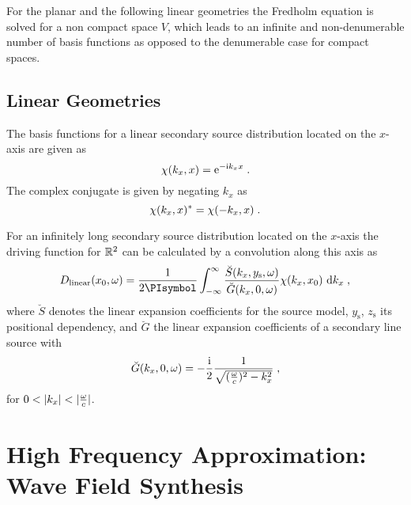 For the planar and the following linear geometries the Fredholm equation is
solved for a non compact space $V$, which leads to an infinite and
non-denumerable number of basis functions as
opposed to the denumerable case for compact spaces.\autocite{Schultz2014}


\subsection{Linear Geometries}
\label{sec:linear_geometries}

The basis functions for a linear secondary source distribution
located on the $x$-axis are given as
%
\begin{equation}
    \chi(k_x,x) = \E^{-\I k_x x} \qp
    \label{eq:linear_harmonics}
\end{equation}
%
The complex conjugate is given by negating $k_x$ as
%
\begin{equation}
    \chi(k_x,x)^* = \chi(-k_x,x) \;.
\end{equation}
%

For an infinitely long secondary source distribution located on the $x$-axis the
driving function for $\mathbb{R}^2$ can be calculated by a convolution along this axis
as\autocite[Compare (3.73) in][]{Ahrens2012}
%
\begin{equation}
    D_\text{linear}(x_0,\omega) = \frac{1}{2\PI} \int_{-\infty}^\infty
    \frac{\breve{S}(k_x,y_\text{s},\omega)}{\breve{G}(k_x,0,\omega)}
    \chi(k_x,x_0) \, \D{k_x} \qc
    \label{eq:D_linear}
\end{equation}
%
where $\breve{S}$ denotes the linear expansion coefficients for the
source model, $y_\text{s}$, $z_\text{s}$ its positional dependency,
and $\breve{G}$ the linear expansion coefficients of a secondary line source with
%
\begin{equation}
    \breve{G}(k_x,0,\omega) = -\frac{\I}{2} \frac{1}{\sqrt{(\omegac)^2-k_x^2}}
    \qc
    \label{eq:G_linear}
\end{equation}
%
for $0<|k_x|<|\omegac|$.


\section[Wave Field Synthesis]{High Frequency Approximation: Wave Field Synthesis}
\label{sec:WFS}


